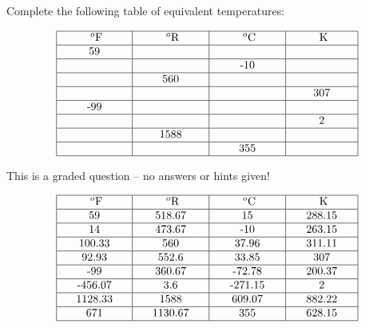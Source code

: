 

Complete the following table of equivalent temperatures:


$$\vbox{\offinterlineskip
\halign{\strut
\vrule \quad\hfil # \ \hfil & 
\vrule \quad\hfil # \ \hfil & 
\vrule \quad\hfil # \ \hfil & 
\vrule \quad\hfil # \ \hfil \vrule \cr
\noalign{\hrule}
%
\hskip 20pt $^{o}$F \hskip 20pt & \hskip 20pt $^{o}$R \hskip 20pt & \hskip 20pt $^{o}$C \hskip 20pt & \hskip 20pt K \hskip 20pt \cr
%
\noalign{\hrule}
%
59 &  &  &  \cr
%
\noalign{\hrule}
%
  &  & -10 &  \cr
%
\noalign{\hrule}
%
  & 560 &  &  \cr
%
\noalign{\hrule}
%
  &  &  & 307 \cr
%
\noalign{\hrule}
%
-99  &  &  &  \cr
%
\noalign{\hrule}
%
  &  &  & 2 \cr
%
\noalign{\hrule}
%
  & 1588 &  &  \cr
%
\noalign{\hrule}
%
  &  & 355 &  \cr
%
\noalign{\hrule}
} %
}$$ %

\vfil 

\eject






This is a graded question -- no answers or hints given!








$$\vbox{\offinterlineskip
\halign{\strut
\vrule \quad\hfil # \ \hfil & 
\vrule \quad\hfil # \ \hfil & 
\vrule \quad\hfil # \ \hfil & 
\vrule \quad\hfil # \ \hfil \vrule \cr
\noalign{\hrule}
%
\hskip 20pt $^{o}$F \hskip 20pt & \hskip 20pt $^{o}$R \hskip 20pt & \hskip 20pt $^{o}$C \hskip 20pt & \hskip 20pt K \hskip 20pt \cr
%
\noalign{\hrule}
%
59 & 518.67 & 15 & 288.15 \cr
%
\noalign{\hrule}
%
14  & 473.67 & -10 & 263.15 \cr
%
\noalign{\hrule}
%
100.33  & 560 & 37.96 & 311.11 \cr
%
\noalign{\hrule}
%
92.93  & 552.6 & 33.85 & 307 \cr
%
\noalign{\hrule}
%
-99  & 360.67 & -72.78 & 200.37 \cr
%
\noalign{\hrule}
%
-456.07  & 3.6 & -271.15 & 2 \cr
%
\noalign{\hrule}
%
1128.33 & 1588 & 609.07 & 882.22 \cr
%
\noalign{\hrule}
%
671 & 1130.67 & 355 & 628.15 \cr
%
\noalign{\hrule}
} %
}$$ %




